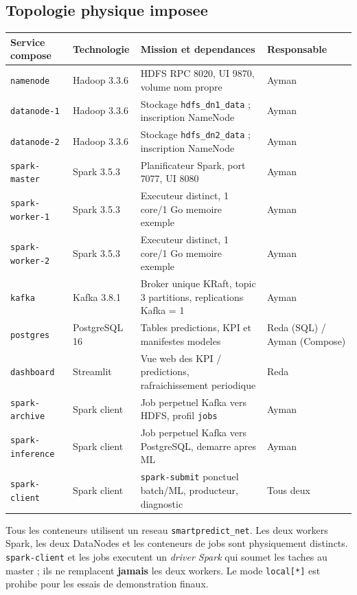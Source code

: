 \documentclass[10pt,a4paper]{article}
\newcommand{\code}[1]{{\small\ttfamily\nolinkurl{#1}}}
\begin{document}
\subsection{Topologie physique imposee}
\begin{longtable}{@{}p{31mm}p{24mm}p{60mm}p{28mm}@{}}
\toprule
\textbf{Service compose} & \textbf{Technologie} & \textbf{Mission et dependances} & \textbf{Responsable}\\\midrule
\endhead
\code{namenode} & Hadoop 3.3.6 & HDFS RPC 8020, UI 9870, volume nom propre & Ayman\\
\code{datanode-1} & Hadoop 3.3.6 & Stockage \code{hdfs_dn1_data} ; inscription NameNode & Ayman\\
\code{datanode-2} & Hadoop 3.3.6 & Stockage \code{hdfs_dn2_data} ; inscription NameNode & Ayman\\
\code{spark-master} & Spark 3.5.3 & Planificateur Spark, port 7077, UI 8080 & Ayman\\
\code{spark-worker-1} & Spark 3.5.3 & Executeur distinct, 1 core/1 Go memoire exemple & Ayman\\
\code{spark-worker-2} & Spark 3.5.3 & Executeur distinct, 1 core/1 Go memoire exemple & Ayman\\
\code{kafka} & Kafka 3.8.1 & Broker unique KRaft, topic 3 partitions, replications Kafka = 1 & Ayman\\
\code{postgres} & PostgreSQL 16 & Tables predictions, KPI et manifestes modeles & Reda (SQL) / Ayman (Compose)\\
\code{dashboard} & Streamlit & Vue web des KPI / predictions, rafraichissement periodique & Reda\\
\code{spark-archive} & Spark client & Job perpetuel Kafka vers HDFS, profil \code{jobs} & Ayman\\
\code{spark-inference} & Spark client & Job perpetuel Kafka vers PostgreSQL, demarre apres ML & Ayman\\
\code{spark-client} & Spark client & \code{spark-submit} ponctuel batch/ML, producteur, diagnostic & Tous deux\\
\bottomrule
\end{longtable}
Tous les conteneurs utilisent un reseau \code{smartpredict_net}. Les deux workers Spark, les deux DataNodes et les conteneurs de jobs sont physiquement distincts. \code{spark-client} et les jobs executent un \emph{driver Spark} qui soumet les taches au master ; ils ne remplacent \textbf{jamais} les deux workers. Le mode \code{local[*]} est prohibe pour les essais de demonstration finaux.
\end{document}
